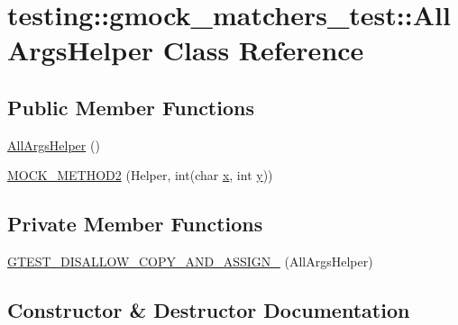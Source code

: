 \hypertarget{classtesting_1_1gmock__matchers__test_1_1_all_args_helper}{}\section{testing\+::gmock\+\_\+matchers\+\_\+test\+::All\+Args\+Helper Class Reference}
\label{classtesting_1_1gmock__matchers__test_1_1_all_args_helper}
\subsection*{Public Member Functions}
\begin{DoxyCompactItemize}
\item 
\mbox{\hyperlink{classtesting_1_1gmock__matchers__test_1_1_all_args_helper_afffee92e50b5545e5b4be8c989ff63ab}{All\+Args\+Helper}} ()
\item 
\mbox{\hyperlink{classtesting_1_1gmock__matchers__test_1_1_all_args_helper_a571b9c1e5ab4e891085060e73c94be32}{M\+O\+C\+K\+\_\+\+M\+E\+T\+H\+O\+D2}} (Helper, int(char \mbox{\hyperlink{_obj__test_2lib_2googletest-master_2googlemock_2test_2gmock-matchers__test_8cc_a6150e0515f7202e2fb518f7206ed97dc}{x}}, int \mbox{\hyperlink{_obj__test_2lib_2googletest-master_2googlemock_2test_2gmock-matchers__test_8cc_a39cb44155237f0205e0feb931d5acbed}{y}}))
\end{DoxyCompactItemize}
\subsection*{Private Member Functions}
\begin{DoxyCompactItemize}
\item 
\mbox{\hyperlink{classtesting_1_1gmock__matchers__test_1_1_all_args_helper_a5ce17b8fd784d6f5667152cdad06d86b}{G\+T\+E\+S\+T\+\_\+\+D\+I\+S\+A\+L\+L\+O\+W\+\_\+\+C\+O\+P\+Y\+\_\+\+A\+N\+D\+\_\+\+A\+S\+S\+I\+G\+N\+\_\+}} (All\+Args\+Helper)
\end{DoxyCompactItemize}


\subsection{Constructor \& Destructor Documentation}
\mbox{\label{classtesting_1_1gmock__matchers__test_1_1_all_args_helper_afffee92e50b5545e5b4be8c989ff63ab}} 
